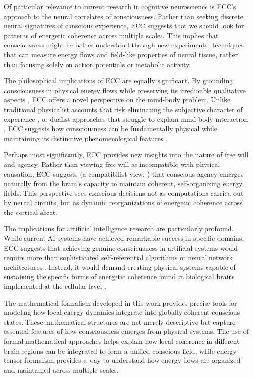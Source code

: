 Of particular relevance to current research in cognitive neuroscience is ECC's approach to the neural correlates of consciousness. Rather than seeking discrete neural signatures of conscious experience, ECC suggests that we should look for patterns of energetic coherence across multiple scales. This implies that consciousness might be better understood through new experimental techniques that can measure energy flows and field-like properties of neural tissue, rather than focusing solely on action potentials or metabolic activity.

The philosophical implications of ECC are equally significant. By grounding consciousness in physical energy flows while preserving its irreducible qualitative aspects \cite{nagel1980like}, ECC offers a novel perspective on the mind-body problem. Unlike traditional physicalist accounts that risk eliminating the subjective character of experience \cite{dennett1993consciousness}, or dualist approaches that struggle to explain mind-body interaction \cite{chalmers1997conscious}, ECC suggests how consciousness can be fundamentally physical while maintaining its distinctive phenomenological features \cite{block1995confusion}.

Perhaps most significantly, ECC provides new insights into the nature of free will and agency. Rather than viewing free will as incompatible with physical causation, ECC suggests (a compatibilist view, \cite{Beebee2002}) that conscious agency emerges naturally from the brain's capacity to maintain coherent, self-organizing energy fields. This perspective sees conscious decisions not as computations carried out by neural circuits, but as dynamic reorganizations of energetic coherence across the cortical sheet.

The implications for artificial intelligence research are particularly profound. While current AI systems have achieved remarkable success in specific domains, ECC suggests that achieving genuine consciousness in artificial systems would require more than sophisticated self-referential algorithms or neural network architectures \cite{hofstadter1999godel,Rumelhart1986}. Instead, it would demand creating physical systems capable of sustaining the specific forms of energetic coherence found in biological brains implemented at the cellular level \cite{margulis2001conscious}.

The mathematical formalism developed in this work provides precise tools for modeling how local energy dynamics integrate into globally coherent conscious states. These mathematical structures are not merely descriptive but capture essential features of how consciousness emerges from physical systems. The use of formal mathematical approaches helps explain how local coherence in different brain regions can be integrated to form a unified conscious field, while energy tensor formalism provides a way to understand how energy flows are organized and maintained across multiple scales.

